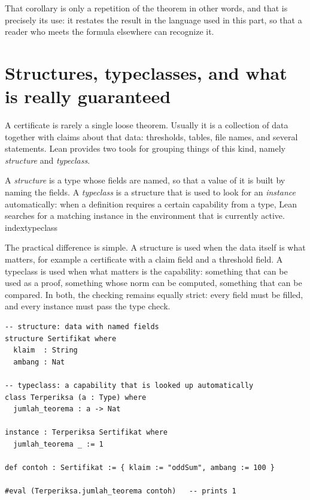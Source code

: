 That corollary is only a repetition of the theorem in other words, and that is precisely its use: it
restates the result in the language used in this part, so that a reader who meets the formula
elsewhere can recognize it.

\section{Structures, typeclasses, and what is really guaranteed}


A certificate is rarely a single loose theorem. Usually it is a collection of data together with
claims about that data: thresholds, tables, file names, and several statements. Lean provides two
tools for grouping things of this kind, namely \emph{structure} and \emph{typeclass}.


\begin{definisi}
A \emph{structure} is a type whose fields are named, so that a value of it is built by naming the
fields. A \emph{typeclass} is a structure that is used to look for an \emph{instance}
automatically: when a definition requires a certain capability from a type, Lean searches for a
matching instance in the environment that is currently active.\\index{typeclass}
\end{definisi}

The practical difference is simple. A structure is used when the data itself is what matters, for
example a certificate with a claim field and a threshold field. A typeclass is used when what
matters is the capability: something that can be used as a proof, something whose norm can be
computed, something that can be compared. In both, the checking remains equally strict: every field
must be filled, and every instance must pass the type check.

\begin{verbatim}
-- structure: data with named fields
structure Sertifikat where
  klaim  : String
  ambang : Nat

-- typeclass: a capability that is looked up automatically
class Terperiksa (a : Type) where
  jumlah_teorema : a -> Nat

instance : Terperiksa Sertifikat where
  jumlah_teorema _ := 1

def contoh : Sertifikat := { klaim := "oddSum", ambang := 100 }

#eval (Terperiksa.jumlah_teorema contoh)   -- prints 1
\end{verbatim}

